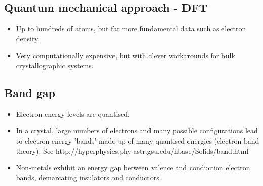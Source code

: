 \subsection{Quantum mechanical approach - DFT}

\begin{itemize}
\item Up to hundreds of atoms, but far more fundamental data such as electron density.
\item Very computationally expensive, but with clever workarounds for bulk crystallographic systems.
\end{itemize}

\subsection{Band gap}

\begin{itemize}
\item Electron energy levels are quantised.
\item In a crystal, large numbers of electrons and many possible configurations lead to electron energy 'bands' made up of many quantised energies (electron band theory). See http://hyperphysics.phy-astr.gsu.edu/hbase/Solids/band.html
\item Non-metals exhibit an energy gap between valence and conduction electron bands, demarcating insulators and conductors.
\end{itemize}

